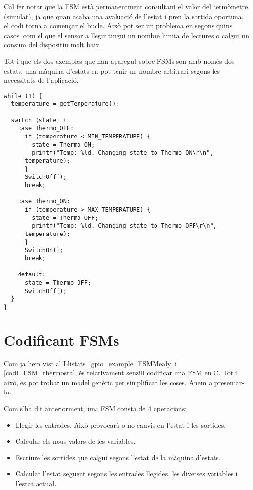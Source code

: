 Cal fer notar que la FSM està permanentment consultant el valor del termòmetre (simulat), ja que quan acaba una avaluació de l'estat i pren la sortida oportuna, el codi torna a començar el bucle. Això pot ser un problema en segons quins casos, com el que el sensor a llegir tingui un nombre limita de lectures o calgui un consum del dispositiu molt baix.

\begin{remark}
 Tot i que els dos exemples que han aparegut sobre FSMs son amb només dos estats, una màquina d'estats en pot tenir un nombre arbitrari segons les necessitats de l'aplicació.
\end{remark}


\begin{lstlisting}[style=customc,caption=Codi de la FSM per un termòstat senzill,label=codi_FSM_thermosta]
while (1) {
  temperature = getTemperature();

  switch (state) {
    case Thermo_OFF:
      if (temperature < MIN_TEMPERATURE) {
        state = Thermo_ON;
        printf("Temp: %ld. Changing state to Thermo_ON\r\n",
	  temperature);
      }
      SwitchOff();
      break;
      
    case Thermo_ON:
      if (temperature > MAX_TEMPERATURE) {
        state = Thermo_OFF;
        printf("Temp: %ld. Changing state to Thermo_OFF\r\n",
	  temperature);
      }
      SwitchOn();
      break;
    
    default:
      state = Thermo_OFF;
      SwitchOff();
  }
} 
\end{lstlisting}

\section{Codificant FSMs}

Com ja hem vist al Llistats~\ref{gpio_example_FSMMealy} i \ref{codi_FSM_thermosta}, és relativament senzill codificar una FSM en C. Tot i això, es pot trobar un model genèric per simplificar les coses. Anem a presentar-lo.

Com s'ha dit anteriorment, una FSM consta de 4 operacions:

\begin{itemize}
 \item Llegir les entrades. Això provocarà o no canvis en l'estat i les sortides.
 \item Calcular els nous valors de les variables.
 \item Escriure les sortides que calgui segons l'estat de la màquina d'estats.
 \item Calcular l'estat següent segons les entrades llegides, les diverses variables i l'estat actual.
\end{itemize}

